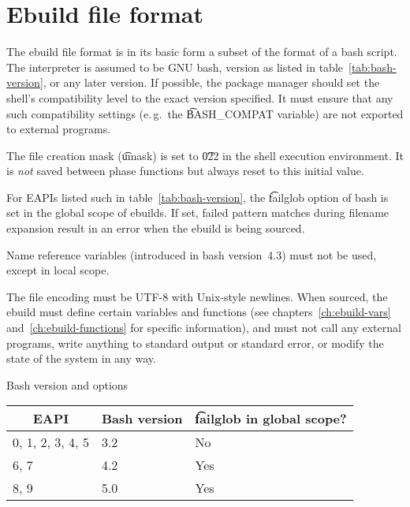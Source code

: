 \chapter{Ebuild file format}
\label{ch:ebuild-format}

 The ebuild file format is in its basic form a subset of the format of
a bash script. The interpreter is assumed to be GNU bash, version as listed in
table~\ref{tab:bash-version}, or any later version. If possible, the package manager should set
the shell's compatibility level to the exact version specified. It must ensure that any such
compatibility settings (e.\,g.\ the \t{BASH_COMPAT} variable) are not exported to external programs.

The file creation mask (\t{umask}) is set to \t{022} in the shell execution environment. It is
\emph{not} saved between phase functions but always reset to this initial value.

 For EAPIs listed such in table~\ref{tab:bash-version}, the \t{failglob}
option of bash is set in the global scope of ebuilds. If set, failed pattern matches during
filename expansion result in an error when the ebuild is being sourced.

Name reference variables (introduced in bash version~4.3) must not be used, except in local scope.

The file encoding must be UTF-8 with Unix-style newlines. When sourced, the ebuild must define
certain variables and functions (see chapters~\ref{ch:ebuild-vars} and~\ref{ch:ebuild-functions}
for specific information), and must not call any external programs, write anything to standard
output or standard error, or modify the state of the system in any way.

\begin{centertable}{Bash version and options}
    \label{tab:bash-version}
    \begin{tabular}{lll}
      \toprule
      \multicolumn{1}{c}{\textbf{EAPI}} &
      \multicolumn{1}{c}{\textbf{Bash version}} &
      \multicolumn{1}{c}{\textbf{\t{failglob} in global scope?}} \\
      \midrule
      0, 1, 2, 3, 4, 5  & 3.2 & No  \\
      6, 7              & 4.2 & Yes \\
      8, 9              & 5.0 & Yes \\
      \bottomrule
    \end{tabular}
\end{centertable}


